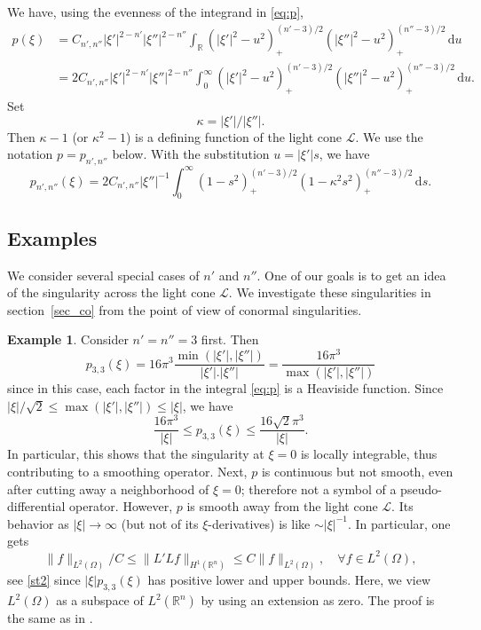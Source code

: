 \documentclass[11pt]{amsart}
\theoremstyle{definition}
\newtheorem{example}[theorem]{Example}
\theoremstyle{remark}
\numberwithin{equation}{section}
\newcommand{\rb}{\mathbb{R}}
\renewcommand{\d}{\,\mathrm{d}}
\begin{document}
We have, using the evenness of the integrand in \eqref{eq:p}, 
\begin{align}
	p(\xi) &= C_{n',n''} |\xi'|^{2-n'}  |\xi''|^{2-n''} \int_{\rb} (|\xi'|^2 - u^2)_+^{(n'-3)/2} (|\xi''|^2 - u^2)_+^{(n''-3)/2} \d u \\
	&= 2C_{n',n''}|\xi'|^{2-n'} |\xi''|^{2-n''} \int_{0}^{\infty} (|\xi'|^2 - u^2)_+^{(n'-3)/2} (|\xi''|^2 - u^2)_+^{(n''-3)/2} \d u.
\end{align}
Set 
\begin{equation}   \label{kappa}
	\kappa = |\xi'|/|\xi''|.
\end{equation}
Then $\kappa-1$ (or $\kappa^2-1$) is a defining function of the light cone $\mathcal L$.  We use the notation $p=p_{n',n''}$ below. With the substitution $u = |\xi'|s$, we have  
\begin{equation}   \label{pp}
p_{n',n''}(\xi) = 2C_{n',n''} |\xi''|^{-1} \int_0^\infty (1-s^2)_+^{(n'-3)/2} (1-\kappa^2 s^2)_+^{(n''-3)/2} \d s.
\end{equation}

\subsection{Examples}\label{example} We consider several special cases of $n'$ and $n''$. One of our goals is to get an idea of the singularity across the light cone $\mathcal L$. We investigate these singularities in section~\ref{sec_co} from the point of view of conormal singularities. 
\begin{example}\label{Ex34}
Consider $n'=n''=3$ first. Then 
\[
p_{3,3}(\xi) = 16\pi^3 \frac{\min(|\xi'|,|\xi''|)}{ |\xi'|.|\xi''| } = \frac{16\pi^3 }{ \max(|\xi'|,|\xi''|) }
\]
since in this case, each factor in the integral  \eqref{eq:p} is a Heaviside function.   
Since $ |\xi|/\sqrt2\le \max(|\xi'|,|\xi''|) \le |\xi|$, we have
\[
\frac{16  \pi^3}{|\xi|}     \le p_{3,3}(\xi) \le \frac{16\sqrt 2 \pi^3}{|\xi|}.
\]
In particular, this shows that the singularity at $\xi=0$ is locally integrable,  thus contributing to a smoothing operator. Next, $p$ is continuous but not smooth, even after cutting away a neighborhood of $\xi=0$; therefore not a symbol of a pseudo-differential operator. However, $p$ is smooth away from the  light cone $\mathcal L$. 
Its behavior as $|\xi|\to\infty$  (but not of its $\xi$-derivatives) is like $\sim |\xi|^{-1}$. In particular, one gets
\begin{equation}   \label{est}
\|f\|_{L^2(\Omega)}/C \le \|L'Lf\|_{H^1(\rb^n)} \le C \|f\|_{L^2(\Omega)},\quad \forall f\in L^2(\Omega),
\end{equation}
see  \eqref{st2} since $|\xi| p_{3,3}(\xi)$ has positive lower and upper bounds. Here, we view $L^2(\Omega)$ as a subspace of $L^2(\rb^n)$ by using an extension as zero. The proof is the same as in \cite{SU-book}.  
\end{example}
\end{document}
